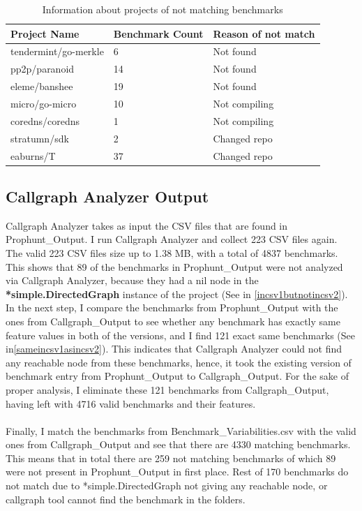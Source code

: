 \documentclass{seal_thesis}
\begin{document}
\begin{table}
\begin{longtable}[c]{@{}lll@{}}
	\caption{Information about projects of not matching benchmarks}
	\label{table:infinalnotcsv1}\\
	\toprule
	Project Name & Benchmark Count & Reason of not match \\* \midrule
	\endfirsthead
	\endhead
	\bottomrule
	\endfoot
	\endlastfoot
	tendermint/go-merkle & 6 & Not found \\
	pp2p/paranoid & 14 & Not found \\
	eleme/banshee & 19 & Not found \\
	micro/go-micro & 10 & Not compiling \\
	coredns/coredns & 1 & Not compiling \\
	stratumn/sdk & 2 & Changed repo \\
	eaburns/T & 37 & Changed repo \\* \bottomrule
\end{longtable}
\end{table}


\subsection{Callgraph Analyzer Output}
Callgraph Analyzer takes as input the CSV files that are found in Prophunt\_Output. I run Callgraph Analyzer and collect 223 CSV files again. The valid 223 CSV files size up to 1.38 MB, with a total of 4837 benchmarks. This shows that 89 of the benchmarks in Prophunt\_Output were not analyzed via Callgraph Analyzer, because they had a nil node in the \textbf{*simple.DirectedGraph} instance of the project (See in \ref{incsv1butnotincsv2}). In the next step, I compare the benchmarks from Prophunt\_Output with the ones from Callgraph\_Output to see whether any benchmark has exactly same feature values in both of the versions, and I find 121 exact same benchmarks (See in\ref{sameincsv1asincsv2}). This indicates that Callgraph Analyzer could not find any reachable node from these benchmarks, hence, it took the existing version of benchmark entry from Prophunt\_Output to Callgraph\_Output. For the sake of proper analysis, I eliminate these 121 benchmarks from Callgraph\_Output, having left with 4716 valid benchmarks and their features.\\
\\
Finally, I match the benchmarks from Benchmark\_Variabilities.csv with the valid ones from Callgraph\_Output and see that there are 4330 matching benchmarks. This means that in total there are 259 not matching benchmarks of which 89 were not present in Prophunt\_Output in first place. Rest of 170 benchmarks do not match due to *simple.DirectedGraph not giving any reachable node, or callgraph tool cannot find the benchmark in the folders. 
\end{document}
